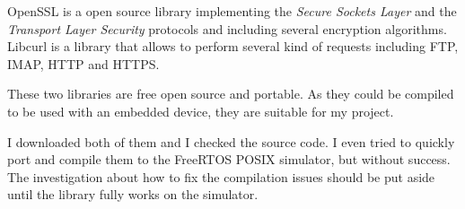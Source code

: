 OpenSSL is a open source library implementing the \textit{Secure Sockets Layer} and the \textit{Transport Layer Security} protocols and including several encryption algorithms. Libcurl is a library that allows to perform several kind of requests including FTP, IMAP, HTTP and HTTPS.

These two libraries are free open source and portable. As they could be compiled to be used with an embedded device, they are suitable for my project.

I downloaded both of them and I checked the source code. I even tried to quickly port and compile them to the FreeRTOS POSIX simulator, but without success. The investigation about how to fix the compilation issues should be put aside until the library fully works on the simulator.


\clearpage